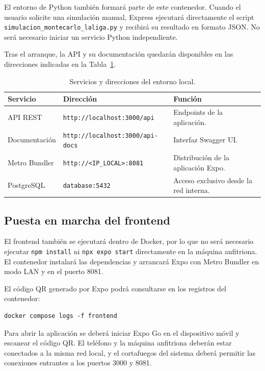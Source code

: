 El entorno de Python tambi\'en formar\'a parte de este contenedor. Cuando el usuario
solicite una simulaci\'on manual, Express ejecutar\'a directamente el script
\texttt{simulacion\_montecarlo\_laliga.py} y recibir\'a su resultado en formato
JSON. No ser\'a necesario iniciar un servicio Python independiente.

Tras el arranque, la API y su documentaci\'on quedar\'an disponibles en las
direcciones indicadas en la Tabla~\ref{tab:servicios-expuestos}.

\begin{table}[H]
\centering
\caption{Servicios y direcciones del entorno local.}
\label{tab:servicios-expuestos}
\begin{tabular}{|p{3.4cm}|l|p{4cm}|}
\hline
\textbf{Servicio} & \textbf{Direcci\'on} & \textbf{Funci\'on} \\
\hline
API REST & \texttt{http://localhost:3000/api} & Endpoints de la aplicaci\'on. \\
\hline
Documentaci\'on & \texttt{http://localhost:3000/api-docs} & Interfaz Swagger UI. \\
\hline
Metro Bundler & \texttt{http://<IP\_LOCAL>:8081} & Distribuci\'on de la aplicaci\'on Expo. \\
\hline
PostgreSQL & \texttt{database:5432} & Acceso exclusivo desde la red interna. \\
\hline
\end{tabular}
\end{table}

\subsection{Puesta en marcha del frontend}

El frontend tambi\'en se ejecutar\'a dentro de Docker, por lo que no ser\'a
necesario ejecutar \texttt{npm install} ni \texttt{npx expo start} directamente
en la m\'aquina anfitriona. El contenedor instalar\'a las dependencias y arrancar\'a
Expo con Metro Bundler en modo LAN y en el puerto 8081.

El c\'odigo QR generado por Expo podr\'a consultarse en los registros del
contenedor:

\begin{lstlisting}
docker compose logs -f frontend
\end{lstlisting}

Para abrir la aplicaci\'on se deber\'a iniciar Expo Go en el dispositivo m\'ovil y
escanear el c\'odigo QR. El tel\'efono y la m\'aquina anfitriona deber\'an estar
conectados a la misma red local, y el cortafuegos del sistema deber\'a permitir las
conexiones entrantes a los puertos 3000 y 8081.


